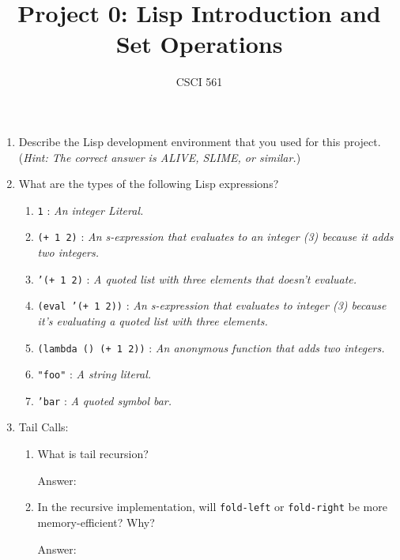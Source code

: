 \documentclass[12pt,letterpaper]{ntdhw}
\title{Project 0: Lisp Introduction and Set Operations}
\author{CSCI 561}
\begin{document}
\pagestyle{fancyplain}

\maketitle
\thispagestyle{fancyplain}

\begin{enumerate}

  \item Describe the Lisp development environment that you used for
  this project.  (\emph{Hint: The correct answer is ALIVE, SLIME, or
    similar.})

  \item What are the types of the following Lisp expressions?
  \begin{enumerate}
    \item {\tt 1} : \emph{
      An integer Literal.
    }
    \item {\tt (+ 1 2)} : \emph{
      An s-expression that evaluates to an integer (3) because it adds two integers.
    }
    \item {\tt '(+ 1 2)} : \emph{
      A quoted list with three elements that doesn't evaluate.
    }
    \item {\tt (eval '(+ 1 2))} : \emph{
      An s-expression that evaluates to integer (3) because it's evaluating a quoted list with three elements.
    }
    \item {\tt (lambda () (+ 1 2))} : \emph{
      An anonymous function that adds two integers.
    }
    \item {\tt "foo"} : \emph{
      A string literal.
    }
    \item {\tt 'bar} : \emph{
      A quoted symbol bar.
    }
  \end{enumerate}

  \item Tail Calls:
  \begin{enumerate}
    \item What is tail recursion?

    \begin{emph}
      Answer: %
    \end{emph}

    \item In the recursive implementation, will {\tt fold-left} or
    {\tt fold-right} be more memory-efficient?  Why?

    \begin{emph}
      Answer: %
    \end{emph}
  \end{enumerate}


\end{enumerate}
\end{document}

